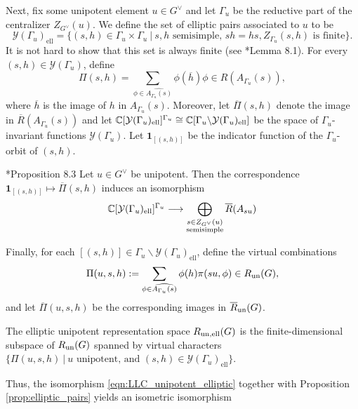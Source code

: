 Next, fix some unipotent element $u\in G^\vee$ and let $\Gamma_u$ be the reductive part of the centralizer $Z_{G^\vee}(u)$. We define the set of elliptic pairs associated to $u$ to be
$$\mathcal{Y}(\Gamma_u)_{\mathrm{ell}}=\{(s,h)\in\Gamma_u\times\Gamma_u\ |\ s,h\text{ semisimple, }sh=hs, Z_{\Gamma_u}(s,h)\text{ is finite}\}.$$
It is not hard to show that this set is always finite (see \cite{AubertCiubotaruRomano2024}*{Lemma 8.1}). For every $(s,h)\in\mathcal{Y}(\Gamma_u)$, define 
\begin{equation}\label{eqn:virtual_ellipticpair}
    \Pi(s,h)=\sum_{\phi\in\widehat{A_{\Gamma_u}(s)}}\phi(\overline{h})\phi\in R(A_{\Gamma_u}(s)),
\end{equation}
where $\overline{h}$ is the image of $h$ in $A_{\Gamma_u}(s)$. Moreover, let $\overline{\Pi}(s,h)$ denote the image in $\overline{R}(A_{\Gamma_u}(s))$ and let $\mathbb{C}[\mathcal{Y}(\Gamma_u)_{\mathrm{ell}}]^{\Gamma_u}\cong\mathbb{C}[\Gamma_u\backslash\mathcal{Y}(\Gamma_u)_{\mathrm{ell}}]$ be the space of $\Gamma_u$-invariant functions $\mathcal{Y}(\Gamma_u)$. Let $\mathbf{1}_{[(s,h)]}$ be the indicator function of the $\Gamma_u$-orbit of $(s,h)$. 
\begin{proposition}\label{prop:elliptic_pairs}\cite{AubertCiubotaruRomano2024}*{Proposition 8.3} Let $u\in G^\vee$ be unipotent. Then the correspondence $\mathbf{1}_{[(s,h)]}\mapsto\overline{\Pi}(s,h)$ induces an isomorphism
    $$\mathbb{C}[\mathcal{Y}(\Gamma_u)_{\mathrm{ell}}]^{\Gamma_u}\longrightarrow\bigoplus_{\substack{s\in Z_{G^\vee}(u)\\\mathrm{semisimple}}}\overline{R}(A_{su})$$
\end{proposition}
Finally, for each $[(s,h)]\in\Gamma_u\backslash\mathcal{Y}(\Gamma_u)_{\mathrm{ell}}$, define the virtual combinations
\begin{equation}
    \Pi(u,s,h):=\sum_{\phi\in\widehat{A_{\Gamma_u}(s)}}\phi(h)\pi(su,\phi)\in R_{\mathrm{un}}(G),
\end{equation}
and let $\overline{\Pi}(u,s,h)$ be the corresponding images in $\overline{R}_{\mathrm{un}}(G)$.
\begin{definition}
    The elliptic unipotent representation space $R_{\mathrm{un},\mathrm{ell}}(G)$ is the finite-dimensional subspace of $R_{\mathrm{un}}(G)$ spanned by virtual characters 
    $\{\Pi(u,s,h)\ |\ u\text{ unipotent, and }(s,h)\in\mathcal{Y}(\Gamma_u)_{\mathrm{ell}}\}.$
\end{definition}
Thus, the isomorphism \eqref{eqn:LLC_unipotent_elliptic} together with Proposition \ref{prop:elliptic_pairs} yields an isometric isomorphism
